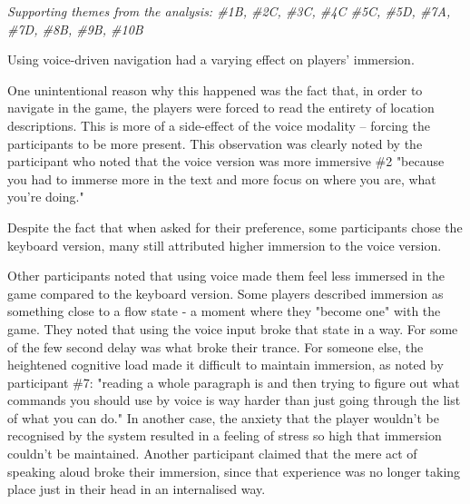 \textit{Supporting themes from the analysis: \#1B, \#2C, \#3C, \#4C \#5C, \#5D, \#7A, \#7D, \#8B, \#9B, \#10B}

Using voice-driven navigation had a varying effect on players' immersion.

One unintentional reason why this happened was the fact that, in order to navigate in the game, the players were forced to read the entirety of location descriptions. This is more of a side-effect of the voice modality -- forcing the participants to be more present. This observation was clearly noted by the participant who noted that the voice version was more immersive \#2 "because you had to immerse more in the text and more focus on where you are, what you're doing." 


Despite the fact that when asked for their preference, some participants chose the keyboard version, many still attributed higher immersion to the voice version.

Other participants noted that using voice made them feel less immersed in the game compared to the keyboard version. 
Some players described immersion as something close to a flow state - a moment where they "become one" with the game.
They noted that using the voice input broke that state in a way. For some of the few second delay was what broke their trance.
For someone else, the heightened cognitive load made it difficult to maintain immersion, as noted by participant \#7: "reading a whole paragraph is and then trying to figure out what commands you should use by voice is way harder than just going through the list of what you can do."
In another case, the anxiety that the player wouldn't be recognised by the system resulted in a feeling of stress so high that immersion couldn't be maintained. Another participant claimed that the mere act of speaking aloud broke their immersion, since that experience was no longer taking place just in their head in an internalised way. 